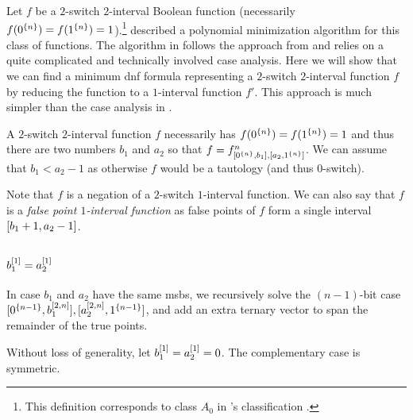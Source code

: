 \newcommand{\ftwointtwoswitch}[4]
{#1^{#2}_{\interval{\rep{0}{#2}}{#3},
\interval{#4}{\rep{1}{#2}}}}

\newcommand{\fnba}{\ftwointtwoswitch{f}{n}{b_1}{a_2}}

Let $f$ be a $2$-switch $2$-interval Boolean function
(necessarily $f(0^{\{n\}}) = f(1^{\{n\}})
= 1$).\footnote{This definition corresponds to class $A_0$
in \citeauthor{Dubovsky2012}'s classification
\citep[p.~5]{Dubovsky2012}.}
\citeauthor{Dubovsky2012} described a polynomial minimization algorithm for this class of functions.
The algorithm in \citet[p.~17]{Dubovsky2012}
follows the approach from \citet{Schieber2005154}
and relies on a quite complicated and technically involved case analysis.
Here we will show that we can find a minimum \acrshort{dnf} formula representing a $2$-switch $2$-interval function $f$ by reducing the function to a $1$-interval function $f'$.
This approach is much simpler
than the case analysis in \citet{Dubovsky2012}.

A $2$-switch $2$-interval function $f$ necessarily has $f(0^{\{n\}})=f(1^{\{n\}})=1$
and thus there are two numbers $b_1$ and $a_2$
so that $f = \fnba$.
We can assume that $b_1 < a_2-1$
as otherwise $f$ would be a tautology
(and thus $0$-switch).

Note that $f$ is a negation of a $2$-switch $1$-interval function.
We can also say that $f$ is a \emph{false point $1$-interval function}
as false points of $f$ form a single interval
$[b_1+1, a_2-1]$.

\subsection{\texorpdfstring{$b_1^{[1]} = a_2^{[1]}$}
{ = }
}


In case $b_1$ and $a_2$ have the same \acrshort{msb}s,
we recursively solve the $(n-1)$-bit
case
$[0^{\{n-1\}}, b_1^{[2, n]}],
[a_2^{[2, n]}, 1^{\{n-1\}}]$,
and add an extra ternary vector to span the remainder
of the true points.

Without loss of generality,
let $b_1^{[1]} = a_2^{[1]} = 0$.
The complementary case is symmetric.

